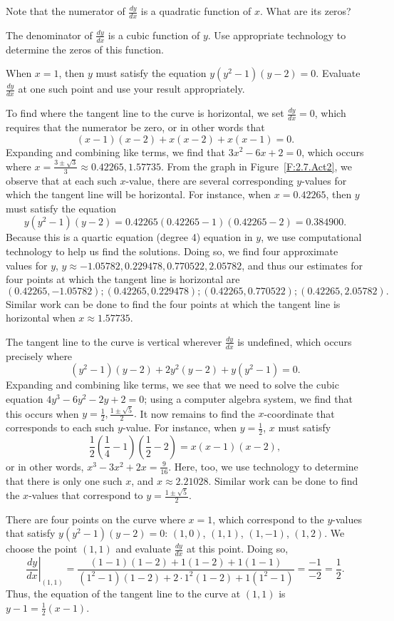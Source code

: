 \begin{bighint}
\ba
	\item Note that the numerator of $\frac{dy}{dx}$ is a quadratic function of $x$.  What are its zeros?
	\item The denominator of $\frac{dy}{dx}$ is a cubic function of $y$.  Use appropriate technology to determine the zeros of this function.
	\item When $x = 1$, then $y$ must satisfy the equation $y(y^2-1)(y-2) = 0$.  Evaluate $\frac{dy}{dx}$ at one such point and use your result appropriately.
\ea
\end{bighint}
\begin{activitySolution}
\ba
	\item To find where the tangent line to the curve is horizontal, we set $\frac{dy}{dx} = 0$, which requires that the numerator be zero, or in other words that
	$$(x-1)(x-2) + x(x-2) + x(x-1) = 0.$$
	Expanding and combining like terms, we find that $3x^2 - 6x + 2 = 0$, which occurs where $x = \frac{3\pm\sqrt{3}}{3} \approx 0.42265, 1.57735$. From the graph in Figure~\ref{F:2.7.Act2}, we observe that at each such $x$-value, there are several corresponding $y$-values for which the tangent line will be horizontal.  For instance, when $x = 0.42265$, then $y$ must satisfy the equation
	$$y(y^2-1)(y-2) = 0.42265(0.42265-1)(0.42265-2) = 0.384900.$$
	Because this is a quartic equation (degree 4) equation in $y$, we use computational technology to help us find the solutions.  Doing so, we find four approximate values for $y$, $y \approx -1.05782, 0.229478, 0.770522, 2.05782$, and thus our estimates for four points at which the tangent line is horizontal are
	$$(0.42265, -1.05782); (0.42265, 0.229478);  (0.42265, 0.770522); (0.42265, 2.05782).$$
	Similar work can be done to find the four points at which the tangent line is horizontal when $x \approx 1.57735$.
	\item The tangent line to the curve is vertical wherever $\frac{dy}{dx}$ is undefined, which occurs precisely where 
	$$(y^2-1)(y-2) + 2y^2(y-2) + y(y^2-1) = 0.$$
	Expanding and combining like terms, we see that we need to solve the cubic equation $4y^3 - 6y^2 - 2y + 2 = 0$; using a computer algebra system, we find that this occurs when $y = \frac{1}{2}, \frac{1 \pm \sqrt{5}}{2}.$  It now remains to find the $x$-coordinate that corresponds to each such $y$-value.  For instance, when $y = \frac{1}{2}$, $x$ must satisfy
	$$\frac{1}{2}(\frac{1}{4}-1)(\frac{1}{2}-2) = x(x-1)(x-2),$$
	or in other words, $x^3 - 3x^2 + 2x = \frac{9}{16}.$  Here, too, we use technology to determine that there is only one such $x$, and $x \approx 2.21028$.  Similar work can be done to find the $x$-values that correspond to $y = \frac{1 \pm \sqrt{5}}{2}$.
	\item There are four points on the curve where $x = 1$, which correspond to the $y$-values that satisfy $y(y^2-1)(y-2) = 0$: $(1,0)$, $(1,1)$, $(1,-1)$, $(1,2)$.  We choose the point $(1,1)$ and evaluate $\frac{dy}{dx}$ at this point.  Doing so,
	  $$\left.\frac{dy}{dx} \right|_{(1,1)} = \frac{(1-1)(1-2) + 1(1-2) + 1(1-1)}{(1^2-1)(1-2) + 2\cdot 1^2(1-2) + 1(1^2-1)} = \frac{-1}{-2} = \frac{1}{2}.$$
Thus, the equation of the tangent line to the curve at $(1,1)$ is $y - 1 = \frac{1}{2}(x-1)$.
\ea
\end{activitySolution}
\aftera